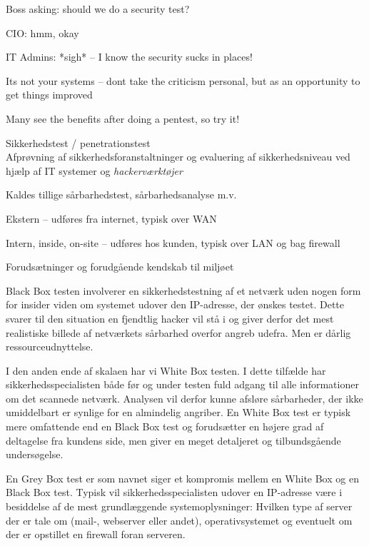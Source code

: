 \documentclass[Screen16to9,17pt]{foils}
\begin{document}
\begin{list2}
\item Boss asking: should we do a security test?
\item CIO: hmm, okay
\item IT Admins: *sigh* -- I know the security sucks in places!
\item Its not your systems -- dont take the criticism personal, but as an opportunity to get things improved
\end{list2}

\vskip 2cm
\centerline{\Large Many see the benefits after doing a pentest, so try it!}



\begin{list1}
\item Sikkerhedstest / penetrationstest\\
Afprøvning af sikkerhedsforanstaltninger og evaluering af
sikkerhedsniveau ved hjælp af IT systemer og \emph{hackerværktøjer}
\item Kaldes tillige sårbarhedstest, sårbarhedsanalyse m.v.
\item Ekstern -- udføres fra internet, typisk over WAN
\item Intern, inside, on-site -- udføres hos kunden, typisk over LAN og
  bag firewall
\end{list1}



\begin{list2}
\item Forudsætninger og forudgående kendskab til miljøet
\item Black Box testen involverer en sikkerhedstestning af et netværk uden
nogen form for insider viden om systemet udover den IP-adresse, der
ønskes testet. Dette svarer til den situation en fjendtlig hacker vil
stå i og giver derfor det mest realistiske billede af netværkets
sårbarhed overfor angreb udefra. Men er dårlig ressourceudnyttelse.
\item I den anden ende  af skalaen har vi White Box testen. I dette tilfælde
har sikkerhedsspecialisten både før og under testen fuld adgang til
alle informationer om det scannede netværk. Analysen vil derfor kunne
afsløre sårbarheder, der ikke umiddelbart er synlige for en almindelig
angriber. En White Box test er typisk mere omfattende end en Black Box
test og forudsætter en højere grad af deltagelse fra kundens side, men
giver en meget detaljeret og tilbundsgående undersøgelse.

\item En Grey Box test er som navnet siger et kompromis mellem en White Box
og en Black Box test. Typisk vil sikkerhedsspecialisten udover en
IP-adresse være i besiddelse af de mest grundlæggende
systemoplysninger: Hvilken type af server der er tale om (mail-,
webserver eller andet), operativsystemet og eventuelt om der er
opstillet en firewall foran serveren.
\end{list2}
\end{document}
